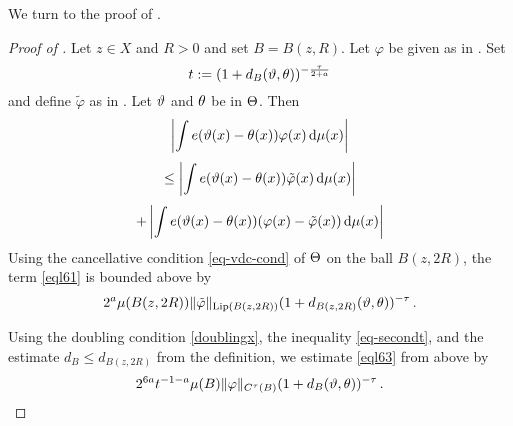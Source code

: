 We turn to the proof of .
\begin{proof}[Proof of ]
Let $z\in X$ and $R>0$ and set $B=B(z,R)$. Let $\varphi$
be given as in .
Set
\begin{equation}\label{eql69}
    t:=(1+d_B({\vartheta},{\theta}))^{-\frac{\tau}{2+a}}
\end{equation}
and define $\tilde{\varphi}$ as in . Let ${\vartheta}$ and ${\theta}$ be in ${\Theta}$.
Then
   \begin{equation}\label{eql60}
       \left|\int e({\vartheta}(x)-{{\theta}(x)}) \varphi (x)\, \mathrm{d}\mu(x)\right|
   \end{equation}
    \begin{equation}\label{eql61}
   \le \left|\int e({\vartheta}(x)-{{\theta}(x)}) \tilde{\varphi} (x)\, \mathrm{d}\mu(x)\right|
   \end{equation}
         \begin{equation}\label{eql62}
     + \left|\int e({\vartheta}(x)-{{\theta}(x)}) (\varphi (x)-\tilde{\varphi}(x))\, \mathrm{d}\mu(x)\right|
   \end{equation}
Using the cancellative condition \eqref{eq-vdc-cond} of ${\Theta}$ on the ball $B(z,2R)$, the term \eqref{eql61} is bounded above by
 \begin{equation}\label{eql63}
       2^a \mu(B(z,2R)) \|\tilde{\varphi}\|_{\operatorname{\operatorname{Lip}}(B(z,2R))} (1 + d_{B(z,2R)}({\vartheta},{\theta}))^{-\tau} \, .
 \end{equation}



Using the doubling condition \eqref{doublingx},
the inequality \eqref{eq-secondt}, and the estimate
$d_B\le d_{B(z,2R)}$ from the definition,
we estimate \eqref{eql63} from above by
\begin{equation}\label{eql64}
       2^{6a}t^{-1-a} \mu(B) \|{\varphi}\|_{C^\tau(B)}
       (1 + d_{B}({\vartheta},{\theta}))^{-\tau} \, .
 \end{equation}


\end{proof}
